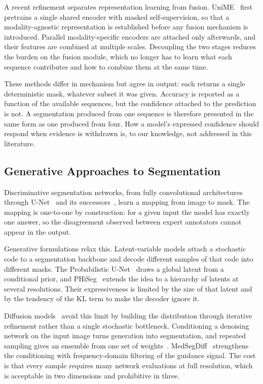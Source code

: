 A recent refinement separates representation learning from fusion.
UniME~\cite{unime} first pretrains a single shared encoder with masked
self-supervision, so that a modality-agnostic representation is established
before any fusion mechanism is introduced. Parallel modality-specific encoders
are attached only afterwards, and their features are combined at multiple
scales. Decoupling the two stages reduces the burden on the fusion module,
which no longer has to learn what each sequence contributes and how to combine
them at the same time.

These methods differ in mechanism but agree in output: each returns a single
deterministic mask, whatever subset it was given. Accuracy is reported as a
function of the available sequences, but the confidence attached to the
prediction is not. A segmentation produced from one sequence is therefore
presented in the same form as one produced from four. How a model's expressed
confidence should respond when evidence is withdrawn is, to our knowledge, not
addressed in this literature.

\subsection{Generative Approaches to Segmentation}
\label{subsec:rw-generative}

Discriminative segmentation networks, from fully convolutional
architectures~\cite{fcn} through U-Net~\cite{unet} and its
successors~\cite{unet++,nnunet}, learn a mapping from image to mask. The
mapping is one-to-one by construction: for a given input the model has exactly
one answer, so the disagreement observed between expert annotators cannot
appear in the output.

Generative formulations relax this. Latent-variable models attach a stochastic
code to a segmentation backbone and decode different samples of that code into
different masks. The Probabilistic U-Net~\cite{probunet} draws a global latent
from a conditional prior, and PHiSeg~\cite{phiseg} extends the idea to a
hierarchy of latents at several resolutions. Their expressiveness is limited
by the size of that latent and by the tendency of the KL term to make the
decoder ignore it.

Diffusion models~\cite{ddpm} avoid this limit by building the distribution
through iterative refinement rather than a single stochastic bottleneck.
Conditioning a denoising network on the input image turns generation into
segmentation, and repeated sampling gives an ensemble from one set of
weights~\cite{ensemblediff,segdiff}. MedSegDiff~\cite{medsegdiff} strengthens
the conditioning with frequency-domain filtering of the guidance signal. The
cost is that every sample requires many network evaluations at full
resolution, which is acceptable in two dimensions and prohibitive in three.

